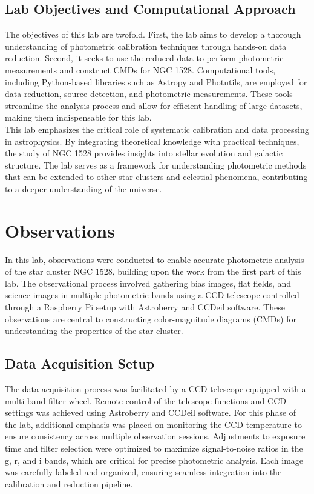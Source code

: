 \documentclass[linenumbers,twocolumn]{aastex631}
\begin{document}
\subsection{Lab Objectives and Computational Approach}

The objectives of this lab are twofold. First, the lab aims to develop a thorough understanding of photometric calibration techniques through hands-on data reduction. Second, it seeks to use the reduced data to perform photometric measurements and construct CMDs for NGC 1528. Computational tools, including Python-based libraries such as Astropy and Photutils, are employed for data reduction, source detection, and photometric measurements. These tools streamline the analysis process and allow for efficient handling of large datasets, making them indispensable for this lab. \\

This lab emphasizes the critical role of systematic calibration and data processing in astrophysics. By integrating theoretical knowledge with practical techniques, the study of NGC 1528 provides insights into stellar evolution and galactic structure. The lab serves as a framework for understanding photometric methods that can be extended to other star clusters and celestial phenomena, contributing to a deeper understanding of the universe.

\section{Observations} \label{sec:observations}

In this lab, observations were conducted to enable accurate photometric analysis of the star cluster NGC 1528, building upon the work from the first part of this lab. The observational process involved gathering bias images, flat fields, and science images in multiple photometric bands using a CCD telescope controlled through a Raspberry Pi setup with Astroberry and CCDeil software. These observations are central to constructing color-magnitude diagrams (CMDs) for understanding the properties of the star cluster.

\subsection{Data Acquisition Setup}

The data acquisition process was facilitated by a CCD telescope equipped with a multi-band filter wheel. Remote control of the telescope functions and CCD settings was achieved using Astroberry and CCDeil software. For this phase of the lab, additional emphasis was placed on monitoring the CCD temperature to ensure consistency across multiple observation sessions. Adjustments to exposure time and filter selection were optimized to maximize signal-to-noise ratios in the g, r, and i bands, which are critical for precise photometric analysis. Each image was carefully labeled and organized, ensuring seamless integration into the calibration and reduction pipeline. \\\\
\end{document}
